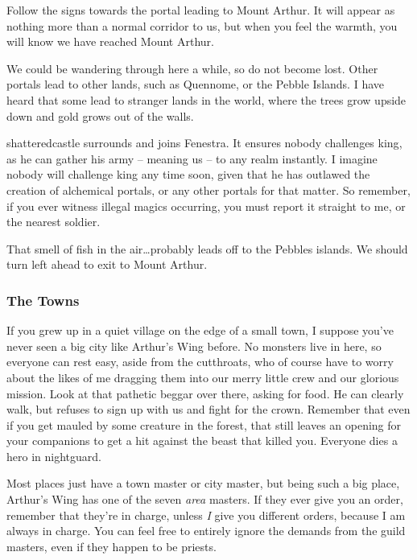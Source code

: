 \begin{multicols}{2}
\begin{exampletext}
	Follow the signs towards the portal leading to Mount Arthur.
	It will appear as nothing more than a normal corridor to us, but when you feel the warmth, you will know we have reached Mount Arthur.

	We could be wandering through here a while, so do not become lost.
	Other portals lead to other lands, such as Quennome, or the Pebble Islands.
	I have heard that some lead to stranger lands in the world, where the trees grow upside down and gold grows out of the walls.

	\Gls{shatteredcastle} surrounds and joins Fenestra.
	It ensures nobody challenges \gls{king}, as he can gather his army -- meaning us -- to any realm instantly.
	I imagine nobody will challenge \gls{king} any time soon, given that he has outlawed the creation of alchemical portals, or any other portals for that matter.
	So remember, if you ever witness illegal magics occurring, you must report it straight to me, or the nearest soldier.

	That smell of fish in the air\ldots probably leads off to the Pebbles islands.
	We should turn left ahead to exit to Mount Arthur.

\end{exampletext}

\subsubsection{The Towns}

\begin{exampletext}

	If you grew up in a quiet village on the edge of a small town, I suppose you've never seen a big city like Arthur's Wing before.
	No monsters live in here, so everyone can rest easy, aside from the cutthroats, who of course have to worry about the likes of me dragging them into our merry little crew and our glorious mission.
	Look at that pathetic beggar over there, asking for food.
	He can clearly walk, but refuses to sign up with us and fight for the crown.
	Remember that even if you get mauled by some creature in the forest, that still leaves an opening for your companions to get a hit against the beast that killed you.
	Everyone dies a hero in \gls{nightguard}.

	Most places just have a town master or city master, but being such a big place, Arthur's Wing has one of the seven \textit{area} masters.
	If they ever give you an order, remember that they're in charge, unless \emph{I} give you different orders, because I am always in charge.
	You can feel free to entirely ignore the demands from the guild masters, even if they happen to be priests.


\end{exampletext}
\end{multicols}

